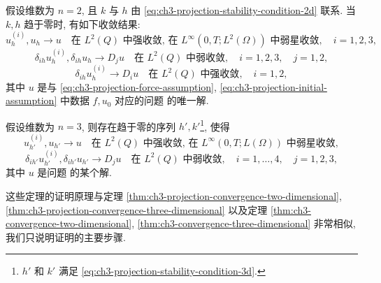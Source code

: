\begin{Theorem}
\label{thm:ch3-projection-discrete-convergence-two-dimensional}
假设维数为 $n=2$, 且 $k$ 与 $h$ 由 \eqref{eq:ch3-projection-stability-condition-2d} 联系. 当 $k,h$ 趋于零时, 有如下收敛结果:
\begin{equation}
u_h^{(i)},u_h\longrightarrow u
\quad\text{在 }L^2(Q)\text{ 中强收敛, 在 }L^\infty(0,T;L^2(\Omega))
\text{ 中弱星收敛},\quad i=1,2,3,
\label{eq:ch3-projection-discrete-convergence-2d-l2}
\end{equation}
\begin{equation}
\delta_{ih}u_h^{(i)},\delta_{ih}u_h
\longrightarrow D_j u
\quad\text{在 }L^2(Q)\text{ 中弱收敛},
\quad i=1,2,3,\quad j=1,2,
\label{eq:ch3-projection-discrete-convergence-2d-derivatives}
\end{equation}
\begin{equation}
\delta_{ih}u_h^{(i)}\longrightarrow D_i u
\quad\text{在 }L^2(Q)\text{ 中强收敛},\quad i=1,2,
\label{eq:ch3-projection-discrete-convergence-2d-strong-directional}
\end{equation}
其中 $u$ 是与 \eqref{eq:ch3-projection-force-assumption}, \eqref{eq:ch3-projection-initial-assumption} 中数据 $f,u_0$ 对应的问题  的唯一解.
\end{Theorem}

\hypertarget{chapter-03-page-301}{}
\begin{Theorem}
\label{thm:ch3-projection-discrete-convergence-three-dimensional}
假设维数为 $n=3$, 则存在趋于零的序列 $h',k'$\footnote{$h'$ 和 $k'$ 满足 \eqref{eq:ch3-projection-stability-condition-3d}.}, 使得
\begin{equation}
u_{h'}^{(i)},u_{h'}
\longrightarrow u
\quad\text{在 }L^2(Q)\text{ 中强收敛, 在 }L^\infty(0,T;L(\Omega))
\text{ 中弱星收敛},
\label{eq:ch3-projection-discrete-convergence-3d-l2}
\end{equation}
\begin{equation}
\delta_{ih'}u_{h'}^{(i)},\delta_{ih'}u_{h'}
\longrightarrow D_j u
\quad\text{在 }L^2(Q)\text{ 中弱收敛},
\quad i=1,\ldots,4,\quad j=1,2,3,
\label{eq:ch3-projection-discrete-convergence-3d-derivatives}
\end{equation}
其中 $u$ 是问题  的某个解.
\end{Theorem}

这些定理的证明原理与定理 \ref{thm:ch3-projection-convergence-two-dimensional}, \ref{thm:ch3-projection-convergence-three-dimensional} 以及定理 \ref{thm:ch3-convergence-two-dimensional}, \ref{thm:ch3-convergence-three-dimensional} 非常相似, 我们只说明证明的主要步骤.

